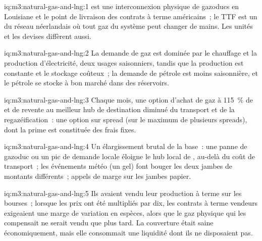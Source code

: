 \begin{solution}{iq:m3:natural-gas-and-lng:1}
 est une interconnexion physique de gazoducs en Louisiane et le point de livraison
des contrats à terme américains~; le TTF est un  du réseau néerlandais où tout gaz du
système peut changer de mains. Les unités et les devises diffèrent aussi.
\end{solution}

\begin{solution}{iq:m3:natural-gas-and-lng:2}
La demande de gaz est dominée par le chauffage et la production d'électricité, deux usages saisonniers, tandis que la production est
constante et le stockage coûteux~; la demande de pétrole est moins saisonnière, et le pétrole se stocke à bon marché dans des réservoirs.
\end{solution}

\begin{solution}{iq:m3:natural-gas-and-lng:3}
Chaque mois, une option d'achat de gaz à 115~\% de  et de revente au meilleur
hub de destination diminué du transport et de la regazéification~: une option sur spread (sur le maximum de
plusieurs spreads), dont la prime est constituée des frais fixes.
\end{solution}

\begin{solution}{iq:m3:natural-gas-and-lng:4}
Un élargissement brutal de la base~: une panne de gazoduc ou un pic de demande locale éloigne le hub local de
, au-delà du coût de transport~; les événements météo (un gel) font bouger les deux jambes de
montants différents~; appels de marge sur les jambes papier.
\end{solution}

\begin{solution}{iq:m3:natural-gas-and-lng:5}
Ils avaient vendu leur production à terme sur les bourses~; lorsque les prix ont été multipliés par dix, les
contrats à terme vendeurs exigeaient une marge de variation en espèces, alors que le gaz physique qui les compensait
ne serait vendu que plus tard. La couverture était saine économiquement, mais elle consommait une liquidité
dont ils ne disposaient pas.
\end{solution}

